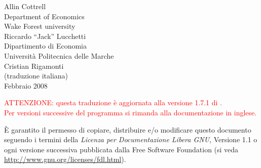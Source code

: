 \documentclass[oneside]{book}
\begin{document}
\renewcommand{\scriptname}{Esempio}
\renewcommand{\GCR}{\textit{Guida ai comandi di gretl}}
\renewcommand{\GUG}{\textit{Guida all'uso di gretl}}

\VerbatimFootnotes

\setlength{\parindent}{0pt}
\setlength{\parskip}{1ex}
\setcounter{tocdepth}{1}


\thispagestyle{empty}

\begin{center}



{\large \sffamily 
Allin Cottrell\\
Department of Economics\\
Wake Forest university\\

\vspace{20pt}
Riccardo ``Jack'' Lucchetti\\
Dipartimento di Economia\\
Università Politecnica delle Marche\\

\vspace{20pt}
Cristian Rigamonti\\
(traduzione italiana)\\

\vspace{20pt}
%
Febbraio 2008

\textcolor{red}{ATTENZIONE: questa traduzione è aggiornata alla versione 1.7.1 di .\\
Per versioni successive del programma si rimanda alla documentazione in inglese.}
}

\end{center}
\clearpage


\thispagestyle{empty}


\vspace*{2in}

È garantito il permesso di copiare, distribuire e/o modificare questo
documento seguendo i termini della \emph{Licenza per Documentazione
  Libera GNU}, Versione 1.1 o ogni versione successiva pubblicata
dalla Free Software Foundation (si veda
\url{http://www.gnu.org/licenses/fdl.html}).
\end{document}
